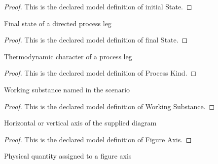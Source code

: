 \begin{proof}
  This is the declared model definition of initial State.
\end{proof}
\begin{definition}
  \label{def:physics:phyx-mini-0367:phyxminiproblems-problemphyxmini0367-processleg-finalstate}
  Final state of a directed process leg
\end{definition}
\begin{proof}
  This is the declared model definition of final State.
\end{proof}
\begin{definition}
  \label{def:physics:phyx-mini-0367:phyxminiproblems-problemphyxmini0367-processkind}
  Thermodynamic character of a process leg
\end{definition}
\begin{proof}
  This is the declared model definition of Process Kind.
\end{proof}
\begin{definition}
  \label{def:physics:phyx-mini-0367:phyxminiproblems-problemphyxmini0367-workingsubstance}
  Working substance named in the scenario
\end{definition}
\begin{proof}
  This is the declared model definition of Working Substance.
\end{proof}
\begin{definition}
  \label{def:physics:phyx-mini-0367:phyxminiproblems-problemphyxmini0367-figureaxis}
  Horizontal or vertical axis of the supplied diagram
\end{definition}
\begin{proof}
  This is the declared model definition of Figure Axis.
\end{proof}
\begin{definition}
  \label{def:physics:phyx-mini-0367:phyxminiproblems-problemphyxmini0367-figureaxisquantity}
  Physical quantity assigned to a figure axis
\end{definition}
